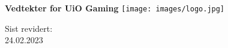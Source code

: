 \begin{titlepage}
\begin{center}
    \vspace*{1cm}

    \Huge
    \textbf{Vedtekter for UiO Gaming}
    \vspace{1cm}
    \vspace{3cm}
    \texttt{[image: images/logo.jpg]}
    \vspace{7cm}

    \LARGE
    Sist revidert:\\
    24.02.2023
\end{center}
\end{titlepage}